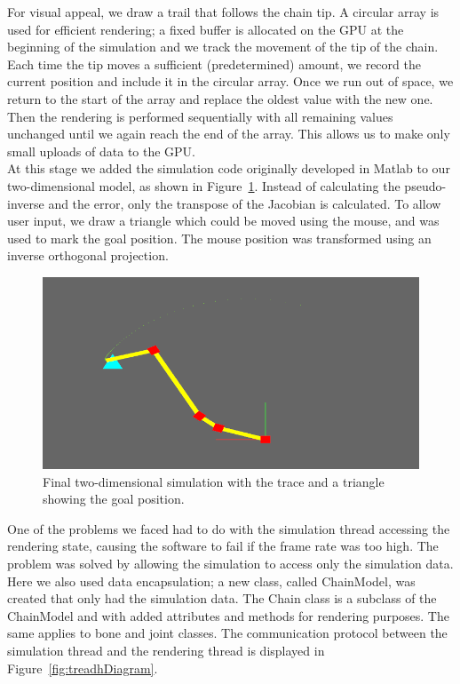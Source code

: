 \documentclass[paper=a4, fontsize=11pt]{scrartcl} %
\numberwithin{equation}{section} %
\numberwithin{figure}{section} %
\numberwithin{table}{section} %
\begin{document}
For visual appeal, we draw a trail that follows the chain tip. A circular array is used for efficient rendering; a fixed buffer is allocated on the GPU at the beginning of the simulation and we track the movement of the tip of the chain. Each time the tip moves a sufficient (predetermined) amount, we record the current position and include it in the circular array. Once we run out of space, we return to the start of the array and replace the oldest value with the new one. Then the rendering is performed sequentially with all remaining values unchanged until we again reach the end of the array. This allows us to make only small uploads of data to the GPU. \\

At this stage we added the simulation code originally developed in Matlab to our two-dimensional model, as shown in Figure~\ref{fig:2Dpicture}. Instead of calculating the pseudo-inverse and the error, only the transpose of the Jacobian is calculated. To allow user input, we draw a triangle which could be moved using the mouse, and was used to mark the goal position. The mouse position was transformed using an inverse orthogonal projection. \\

\begin{figure}[h]
\centering
\includegraphics[scale=0.4]{chain2Dv2}
\caption{Final two-dimensional simulation with the trace and a triangle showing the goal position.}
\label{fig:2Dpicture}
\end{figure}

One of the problems we faced had to do with the simulation thread accessing the rendering state, causing the software to fail if the frame rate was too high. The problem was solved by allowing the simulation to access only the simulation data. Here we also used data encapsulation; a new class, called ChainModel, was created that only had the simulation data. The Chain class is a subclass of the ChainModel and with added attributes and methods for rendering purposes. The same applies to bone and joint classes. The communication protocol between the simulation thread and the rendering thread is displayed in Figure~\ref{fig:treadhDiagram}.  \\
\end{document}
